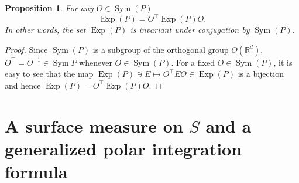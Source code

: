 \documentclass[11pt]{article}
\newtheorem{proposition}[theorem]{Proposition}
\newcommand\OdR{\mbox{O}_d(\mathbb{R})} %
\newcommand\Sym{\operatorname{Sym}}
\newcommand\Exp{\operatorname{Exp}}
\begin{document}
\begin{proposition}\label{prop:ExpP}
For any  $O \in \Sym{(P)} $
\begin{equation*}
    \Exp(P) = O^\top \Exp(P) O.
\end{equation*}
In other words, the set $\Exp(P)$ is invariant under conjugation by $\Sym(P)$.
\end{proposition}

\begin{proof}
Since $\Sym(P)$ is a subgroup of the orthogonal group $O(\mathbb{R}^d)$, $O^\top = O^{-1} \in \Sym{P}$ whenever $O\in\Sym(P)$. For a fixed $O\in\Sym(P)$, it is easy to see that the map $\Exp(P)\ni E\mapsto  O^\top E O\in\Exp(P)$ is a bijection and hence $\Exp(P)=O^\top \Exp(P) O$. 
\end{proof}







\section{A surface measure on $S$ and a generalized polar integration formula}\label{sec:IntegrationFormula}
\end{document}
